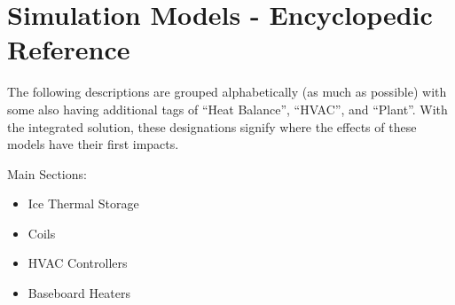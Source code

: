 \chapter{Simulation Models - Encyclopedic Reference}\label{simulation-models---encyclopedic-reference-001}

The following descriptions are grouped alphabetically (as much as possible) with some also having additional tags of ``Heat Balance'', ``HVAC'', and ``Plant''. With the integrated solution, these designations signify where the effects of these models have their first impacts.

Main Sections:

\begin{itemize}
  \tightlist
  \item Ice Thermal Storage
  \item Coils
  \item HVAC Controllers
  \item Baseboard Heaters 
\end{itemize}
